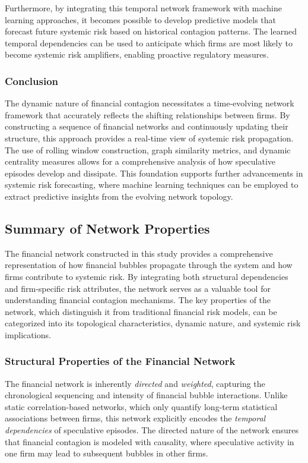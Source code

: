 \documentclass[preprint,12pt,authoryear]{elsarticle}
\begin{document}
Furthermore, by integrating this temporal network framework with machine learning approaches, it becomes possible to develop predictive models that forecast future systemic risk based on historical contagion patterns. The learned temporal dependencies can be used to anticipate which firms are most likely to become systemic risk amplifiers, enabling proactive regulatory measures.

\subsubsection{Conclusion}  

The dynamic nature of financial contagion necessitates a time-evolving network framework that accurately reflects the shifting relationships between firms. By constructing a sequence of financial networks and continuously updating their structure, this approach provides a real-time view of systemic risk propagation. The use of rolling window construction, graph similarity metrics, and dynamic centrality measures allows for a comprehensive analysis of how speculative episodes develop and dissipate. This foundation supports further advancements in systemic risk forecasting, where machine learning techniques can be employed to extract predictive insights from the evolving network topology.


\subsection{Summary of Network Properties}  

The financial network constructed in this study provides a comprehensive representation of how financial bubbles propagate through the system and how firms contribute to systemic risk. By integrating both structural dependencies and firm-specific risk attributes, the network serves as a valuable tool for understanding financial contagion mechanisms. The key properties of the network, which distinguish it from traditional financial risk models, can be categorized into its topological characteristics, dynamic nature, and systemic risk implications.

\subsubsection{Structural Properties of the Financial Network}  

The financial network is inherently \textit{directed} and \textit{weighted}, capturing the chronological sequencing and intensity of financial bubble interactions. Unlike static correlation-based networks, which only quantify long-term statistical associations between firms, this network explicitly encodes the \textit{temporal dependencies} of speculative episodes. The directed nature of the network ensures that financial contagion is modeled with causality, where speculative activity in one firm may lead to subsequent bubbles in other firms.
\end{document}
